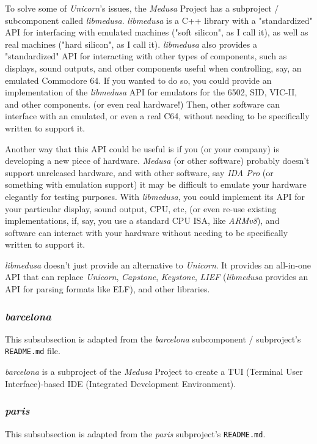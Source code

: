 \documentclass{article}
\begin{document}
	To solve some of \textit{Unicorn}'s issues, the \textit{Medusa} Project has
	a subproject / subcomponent called \textit{libmedusa}. \textit{libmedusa} is
	a C++ library with a "standardized" API for interfacing with emulated
	machines ("soft silicon", as I call it), as well as real machines ("hard
	silicon", as I call it). \textit{libmedusa} also provides a "standardized"
	API for interacting with other types of components, such as displays, sound
	outputs, and other components useful when controlling, say, an emulated
	Commodore 64. If you wanted to do so, you could provide an implementation of
	the \textit{libmedusa} API for emulators for the 6502, SID, VIC-II, and
	other components. (or even real hardware!) Then, other software can
	interface with an emulated, or even a real C64, without needing to be
	specifically written to support it.

	Another way that this API could be useful is if you (or your company) is
	developing a new piece of hardware. \textit{Medusa} (or other software)
	probably doesn't support unreleased hardware, and with other software, say
	\textit{IDA Pro} (or something with emulation support) it may be difficult
	to emulate your hardware elegantly for testing purposes. With
	\textit{libmedusa}, you could implement its API for your particular display,
	sound output, CPU, etc, (or even re-use existing implementations, if, say,
	you use a standard CPU ISA, like \textit{ARMv8}), and software can interact
	with your hardware without needing to be specifically written to support it.

	\textit{libmedusa} doesn't just provide an alternative to \textit{Unicorn}.
	It provides an all-in-one API that can replace \textit{Unicorn},
	\textit{Capstone}, \textit{Keystone}, \textit{LIEF} (\textit{libmedusa}
	provides an API for parsing formats like ELF), and other libraries.

	\subsubsection{\textit{barcelona}}
	This subsubsection is adapted from the \textit{barcelona} subcomponent /
	subproject's \texttt{README.md} file.

	\textit{barcelona} is a subproject of the \textit{Medusa} Project to create
	a TUI (Terminal User Interface)-based IDE (Integrated Development
	Environment).

	\subsubsection{\textit{paris}}
	This subsubsection is adapted from the \textit{paris} subproject's
	\texttt{README.md}.
\end{document}
